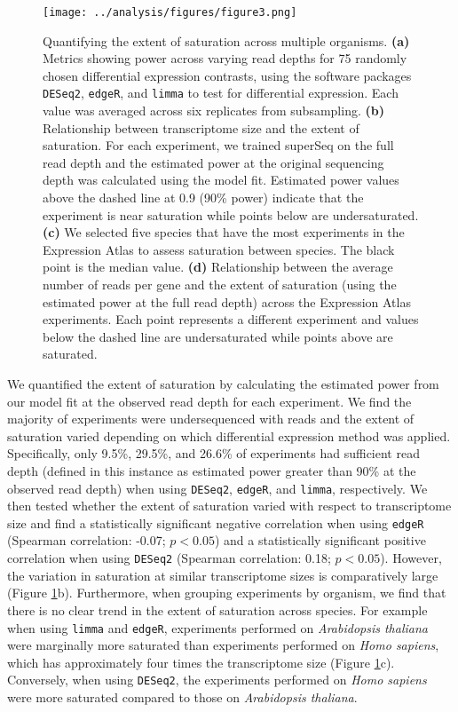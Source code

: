 \documentclass[11pt]{article}
\begin{document}
\begin{figure}[!ht]
\texttt{[image: ../analysis/figures/figure3.png]}
\centering
\caption{Quantifying the extent of saturation across multiple organisms. \textbf{(a)} Metrics showing power across varying read depths for 75 randomly chosen differential expression contrasts, using the software packages {\tt DESeq2}, {\tt edgeR}, and {\tt limma} to test for differential expression. Each value was averaged across six replicates from subsampling. \textbf{(b)} Relationship between transcriptome size and the extent of saturation. For each experiment, we trained superSeq on the full read depth and the estimated power at the original sequencing depth was calculated using the model fit. Estimated power values above the dashed line at 0.9 (90\% power) indicate that the experiment is near saturation while points below are undersaturated. \textbf{(c)} We selected five species that have the most experiments in the Expression Atlas to assess saturation between species. The black point is the median value. \textbf{(d)} Relationship between the average number of reads per gene and the extent of saturation (using the estimated power at the full read depth) across the Expression Atlas experiments. Each point represents a different experiment and values below the dashed line are undersaturated while points above are saturated.}
\label{fig:fig3}
\end{figure}
\FloatBarrier

We quantified the extent of saturation by calculating the estimated power from our model fit at the observed read depth for each experiment. We find the majority of experiments were undersequenced with reads and the extent of saturation varied depending on which differential expression method was applied. Specifically, only 9.5\%, 29.5\%, and 26.6\% of experiments had sufficient read depth (defined in this instance as estimated power greater than 90\% at the observed read depth) when using \texttt{DESeq2}, \texttt{edgeR}, and \texttt{limma}, respectively. We then tested whether the extent of saturation varied with respect to transcriptome size and find a statistically significant negative correlation when using \texttt{edgeR} (Spearman correlation: -0.07; $p < 0.05$) and a statistically significant positive correlation when using \texttt{DESeq2} (Spearman correlation: 0.18; $p < 0.05$). However, the variation in saturation at similar transcriptome sizes is comparatively large (Figure \ref{fig:fig3}b). Furthermore, when grouping experiments by organism, we find that there is no clear trend in the extent of saturation across species. For example when using \texttt{limma} and \texttt{edgeR}, experiments performed on \textit{Arabidopsis thaliana} were marginally more saturated than experiments performed on \textit{Homo sapiens}, which has approximately four times the transcriptome size (Figure \ref{fig:fig3}c). Conversely, when using \texttt{DESeq2}, the experiments performed on \textit{Homo sapiens} were more saturated compared to those on \textit{Arabidopsis thaliana}.
\end{document}
